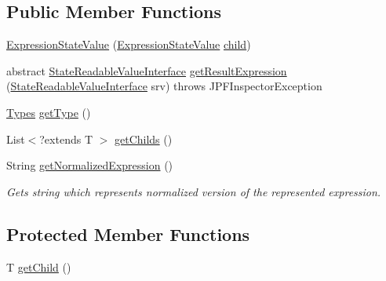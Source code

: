 \subsection*{Public Member Functions}
\begin{DoxyCompactItemize}
\item 
\hyperlink{classgov_1_1nasa_1_1jpf_1_1inspector_1_1server_1_1expression_1_1expressions_1_1_expression_state_value_a52a63cdb0ce385a7b82600d3f16fe1ee}{Expression\+State\+Value} (\hyperlink{classgov_1_1nasa_1_1jpf_1_1inspector_1_1server_1_1expression_1_1expressions_1_1_expression_state_value}{Expression\+State\+Value} \hyperlink{classgov_1_1nasa_1_1jpf_1_1inspector_1_1server_1_1expression_1_1_expression_state_unary_operator_a66041b1f569a361549e28a00f7ca5f2f}{child})
\item 
abstract \hyperlink{interfacegov_1_1nasa_1_1jpf_1_1inspector_1_1server_1_1programstate_1_1_state_readable_value_interface}{State\+Readable\+Value\+Interface} \hyperlink{classgov_1_1nasa_1_1jpf_1_1inspector_1_1server_1_1expression_1_1expressions_1_1_expression_state_value_a2824434e3ea0bcaccd0e42b410a81156}{get\+Result\+Expression} (\hyperlink{interfacegov_1_1nasa_1_1jpf_1_1inspector_1_1server_1_1programstate_1_1_state_readable_value_interface}{State\+Readable\+Value\+Interface} srv)  throws J\+P\+F\+Inspector\+Exception
\item 
\hyperlink{enumgov_1_1nasa_1_1jpf_1_1inspector_1_1server_1_1expression_1_1_types}{Types} \hyperlink{classgov_1_1nasa_1_1jpf_1_1inspector_1_1server_1_1expression_1_1expressions_1_1_expression_state_value_a9317f49f60c166a2f46f90702e75f22e}{get\+Type} ()
\item 
List$<$?extends T $>$ \hyperlink{classgov_1_1nasa_1_1jpf_1_1inspector_1_1server_1_1expression_1_1_expression_state_unary_operator_ad010bcb9c4e2eb584321b5ceba8e1682}{get\+Childs} ()
\item 
String \hyperlink{interfacegov_1_1nasa_1_1jpf_1_1inspector_1_1server_1_1expression_1_1_expression_node_interface_ae5387d8da0126c1256a786d54b9bd7ce}{get\+Normalized\+Expression} ()
\begin{DoxyCompactList}\small\item\em Gets string which represents normalized version of the represented expression. \end{DoxyCompactList}\end{DoxyCompactItemize}
\subsection*{Protected Member Functions}
\begin{DoxyCompactItemize}
\item 
T \hyperlink{classgov_1_1nasa_1_1jpf_1_1inspector_1_1server_1_1expression_1_1_expression_state_unary_operator_a150bac338d6557f79ca185d3f6ad6e06}{get\+Child} ()
\end{DoxyCompactItemize}

